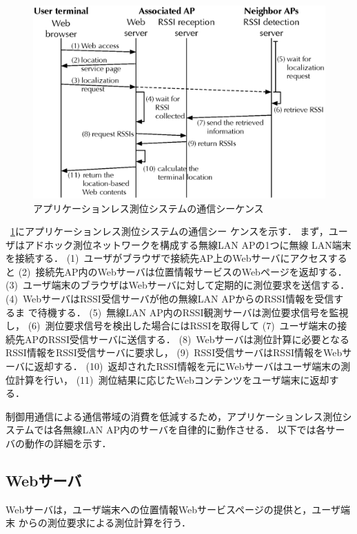 \documentclass[technicalreport]{ieicej}
\begin{document}
\begin{figure}[bt]
 \centering
 \includegraphics[width=\columnwidth]{figure/sequence.eps}
 \caption{アプリケーションレス測位システムの通信シーケンス}
 \label{fig:sequence}
\end{figure}

\figurename~\ref{fig:sequence}にアプリケーションレス測位システムの通信シー
ケンスを示す．
まず，ユーザはアドホック測位ネットワークを構成する無線LAN APの1つに無線
LAN端末を接続する．
(1)~ユーザがブラウザで接続先AP上のWebサーバにアクセスすると
(2)~接続先AP内のWebサーバは位置情報サービスのWebページを返却する．
(3)~ユーザ端末のブラウザはWebサーバに対して定期的に測位要求を送信する．
(4)~WebサーバはRSSI受信サーバが他の無線LAN APからのRSSI情報を受信するま
で待機する．
(5)~無線LAN AP内のRSSI観測サーバは測位要求信号を監視し，
(6)~測位要求信号を検出した場合にはRSSIを取得して
(7)~ユーザ端末の接続先APのRSSI受信サーバに送信する．
(8)~Webサーバは測位計算に必要となるRSSI情報をRSSI受信サーバに要求し，
(9)~RSSI受信サーバはRSSI情報をWebサーバに返却する．
(10)~返却されたRSSI情報を元にWebサーバはユーザ端末の測位計算を行い，
(11)~測位結果に応じたWebコンテンツをユーザ端末に返却する．

制御用通信による通信帯域の消費を低減するため，アプリケーションレス測位シ
ステムでは各無線LAN AP内のサーバを自律的に動作させる．
以下では各サーバの動作の詳細を示す．

\subsection{Webサーバ}
\label{ssec:design_web_server}

Webサーバは，ユーザ端末への位置情報Webサービスページの提供と，ユーザ端末
からの測位要求による測位計算を行う．
\end{document}
